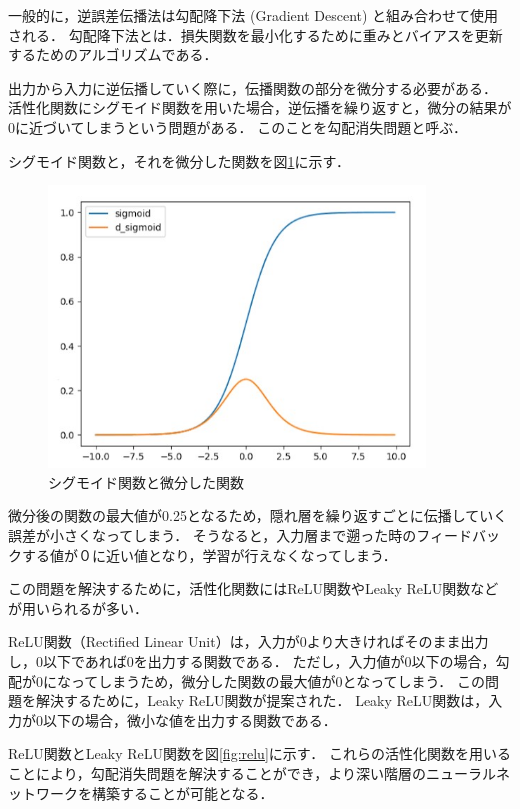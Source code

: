 \documentclass[a4j,12pt,dvipdfmx]{jreport}
\begin{document}
一般的に，逆誤差伝播法は勾配降下法 (Gradient Descent) と組み合わせて使用される．
勾配降下法とは．損失関数を最小化するために重みとバイアスを更新するためのアルゴリズムである．

出力から入力に逆伝播していく際に，伝播関数の部分を微分する必要がある．
活性化関数にシグモイド関数を用いた場合，逆伝播を繰り返すと，微分の結果が0に近づいてしまうという問題がある．
このことを勾配消失問題と呼ぶ．

シグモイド関数と，それを微分した関数を図\ref{fig:sigmoid}に示す．

\begin{figure}[b]
  \centering
  \includegraphics[width=10cm]{image/sigmoid.jpg}
  \caption{シグモイド関数と微分した関数}
  \label{fig:sigmoid}
\end{figure}

微分後の関数の最大値が0.25となるため，隠れ層を繰り返すごとに伝播していく誤差が小さくなってしまう．
そうなると，入力層まで遡った時のフィードバックする値が０に近い値となり，学習が行えなくなってしまう．

この問題を解決するために，活性化関数にはReLU関数やLeaky ReLU関数などが用いられるが多い．

ReLU関数（Rectified Linear Unit）は，入力が0より大きければそのまま出力し，0以下であれば0を出力する関数である．
ただし，入力値が0以下の場合，勾配が0になってしまうため，微分した関数の最大値が0となってしまう．
この問題を解決するために，Leaky ReLU関数が提案された．
Leaky ReLU関数は，入力が0以下の場合，微小な値を出力する関数である．

ReLU関数とLeaky ReLU関数を図\ref{fig:relu}に示す．
これらの活性化関数を用いることにより，勾配消失問題を解決することができ，より深い階層のニューラルネットワークを構築することが可能となる．
\end{document}
